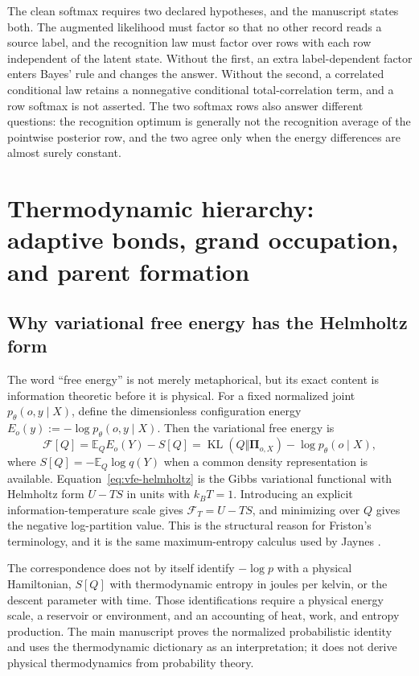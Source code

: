 \documentclass[11pt,letterpaper]{article}
\newcommand{\KL}{\operatorname{KL}}
\newcommand{\Post}{\boldsymbol\Pi}
\newcommand{\Ex}{\mathbb E}
\begin{document}
\begin{boundarybox}
The clean softmax requires two declared hypotheses, and the manuscript states both. The augmented likelihood must factor so that no other record reads a source label, and the recognition law must factor over rows with each row independent of the latent state. Without the first, an extra label-dependent factor enters Bayes' rule and changes the answer. Without the second, a correlated conditional law retains a nonnegative conditional total-correlation term, and a row softmax is not asserted. The two softmax rows also answer different questions: the recognition optimum is generally not the recognition average of the pointwise posterior row, and the two agree only when the energy differences are almost surely constant.
\end{boundarybox}

\section{Thermodynamic hierarchy: adaptive bonds, grand occupation, and parent formation}
\label{sec:thermodynamic-hierarchy}

\subsection{Why variational free energy has the Helmholtz form}

The word ``free energy'' is not merely metaphorical, but its exact content is information theoretic before it is physical. For a fixed normalized joint \(p_\theta(o,y\mid X)\), define the dimensionless configuration energy \(E_o(y):=-\log p_\theta(o,y\mid X)\). Then the variational free energy is
\begin{equation}
  \mathcal F[Q]
  =\Ex_Q E_o(Y)-S[Q]
  =\KL(Q\Vert\Post_{o,X})-\log p_\theta(o\mid X),
  \label{eq:vfe-helmholtz}
\end{equation}
where \(S[Q]=-\Ex_Q\log q(Y)\) when a common density representation is available. Equation~\eqref{eq:vfe-helmholtz} is the Gibbs variational functional with Helmholtz form \(U-TS\) in units with \(k_B T=1\). Introducing an explicit information-temperature scale gives \(\mathcal F_T=U-TS\), and minimizing over \(Q\) gives the negative log-partition value. This is the structural reason for Friston's terminology, and it is the same maximum-entropy calculus used by Jaynes \cite{Friston2010,Jaynes1957}.

The correspondence does not by itself identify \(-\log p\) with a physical Hamiltonian, \(S[Q]\) with thermodynamic entropy in joules per kelvin, or the descent parameter with time. Those identifications require a physical energy scale, a reservoir or environment, and an accounting of heat, work, and entropy production. The main manuscript proves the normalized probabilistic identity and uses the thermodynamic dictionary as an interpretation; it does not derive physical thermodynamics from probability theory.
\end{document}

